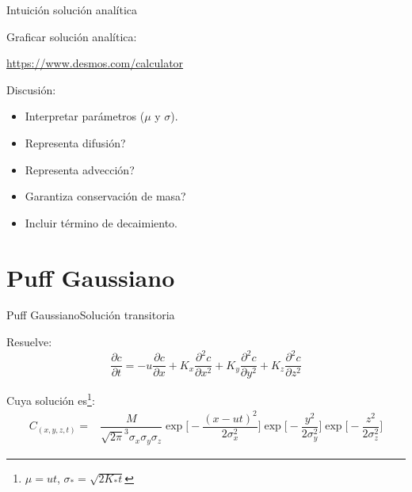 \begin{frame}{Intuición solución analítica}
    
    Graficar solución analítica:
    
    \begin{center}
    \Large
        \href{https://www.desmos.com/calculator}{https://www.desmos.com/calculator}
    \end{center}
    
    Discusión:
    \begin{itemize}
        \item  Interpretar parámetros ($\mu$ y $\sigma$).
        \item Representa difusión?
        \item Representa advección?
        \item Garantiza conservación de masa?
        \item Incluir término de decaimiento.
    \end{itemize}
    
\end{frame}

\section{Puff Gaussiano}

\begin{frame}{Puff Gaussiano}{Solución \alert{transitoria} }

Resuelve:   
$$ \dfrac{\partial c}{\partial t} = - u \dfrac{\partial c}{\partial x} + K_x\dfrac{\partial^2 c}{\partial x^2} +K_y\dfrac{\partial^2 c}{\partial y^2} +K_z\dfrac{\partial^2 c}{\partial z^2} $$

\pause

Cuya solución es\footnote{$\mu= u t$, $\sigma_{*}=\sqrt{2K_{*}t}$}:
     $$\begin{array}{ll}
     C_{(x,y,z,t)} = & \dfrac{M}{\sqrt{2\pi}^3\sigma_x\sigma_y\sigma_z} \exp \bigg[ - \dfrac{(x-ut)^2}{2\sigma_x^2} \bigg] \exp \bigg[ -\dfrac{y^2}{2\sigma_y^2} \bigg] \exp \bigg[ - \dfrac{z^2}{2\sigma_z^2} \bigg] 
     \end{array}
     $$

\pause
\begin{center}
\end{center}
\end{frame}

